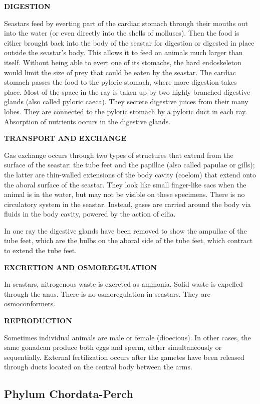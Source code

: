 \documentclass[
]{book}
\begin{document}
\textbf{DIGESTION}

Seastars feed by everting part of the cardiac stomach through their mouths out into the water (or even directly into the shells of molluscs). Then the food is either brought back into the body of the seastar for digestion or digested in place outside the seastar's body. This allows it to feed on animals much larger than itself. Without being able to evert one of its stomachs, the hard endoskeleton would limit the size of prey that could be eaten by the seastar. The cardiac stomach passes the food to the pyloric stomach, where more digestion takes place. Most of the space in the ray is taken up by two highly branched digestive glands (also called pyloric caeca). They secrete digestive juices from their many lobes. They are connected to the pyloric stomach by a pyloric duct in each ray. Absorption of nutrients occurs in the digestive glands.

\textbf{TRANSPORT AND EXCHANGE}

Gas exchange occurs through two types of structures that extend from the surface of the seastar: the tube feet and the papillae (also called papulae or gills); the latter are thin-walled extensions of the body cavity (coelom) that extend onto the aboral surface of the seastar. They look like small finger-like sacs when the animal is in the water, but may not be visible on these specimens. There is no circulatory system in the seastar. Instead, gases are carried around the body via fluids in the body cavity, powered by the action of cilia.

In one ray the digestive glands have been removed to show the ampullae of the tube feet, which are the bulbs on the aboral side of the tube feet, which contract to extend the tube feet.

\textbf{EXCRETION AND OSMOREGULATION}

In seastars, nitrogenous waste is excreted as ammonia. Solid waste is expelled through the anus. There is no osmoregulation in seastars. They are osmoconformers.

\textbf{REPRODUCTION}

Sometimes individual animals are male or female (dioecious). In other cases, the same gonadcan produce both eggs and sperm, either simultaneously or sequentially. External fertilization occurs after the gametes have been released through ducts located on the central body between the arms.

\hypertarget{phylum-chordata-perch}{%
\subsection*{Phylum Chordata-Perch}\label{phylum-chordata-perch}}
\end{document}
